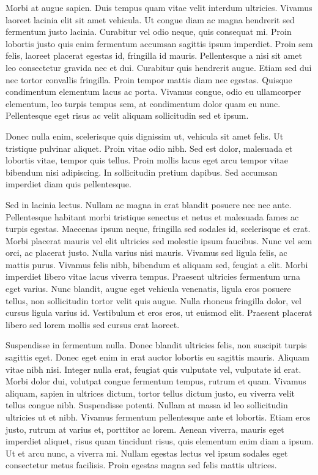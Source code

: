 \begin{acknowledgements}
Morbi at augue sapien. Duis tempus quam vitae velit interdum ultricies. Vivamus laoreet lacinia elit sit amet vehicula. Ut congue diam ac magna hendrerit sed fermentum justo lacinia. Curabitur vel odio neque, quis consequat mi. Proin lobortis justo quis enim fermentum accumsan sagittis ipsum imperdiet. Proin sem felis, laoreet placerat egestas id, fringilla id mauris. Pellentesque a nisi sit amet leo consectetur gravida nec et dui. Curabitur quis hendrerit augue. Etiam sed dui nec tortor convallis fringilla. Proin tempor mattis diam nec egestas. Quisque condimentum elementum lacus ac porta. Vivamus congue, odio eu ullamcorper elementum, leo turpis tempus sem, at condimentum dolor quam eu nunc. Pellentesque eget risus ac velit aliquam sollicitudin sed et ipsum.

Donec nulla enim, scelerisque quis dignissim ut, vehicula sit amet felis. Ut tristique pulvinar aliquet. Proin vitae odio nibh. Sed est dolor, malesuada et lobortis vitae, tempor quis tellus. Proin mollis lacus eget arcu tempor vitae bibendum nisi adipiscing. In sollicitudin pretium dapibus. Sed accumsan imperdiet diam quis pellentesque.

Sed in lacinia lectus. Nullam ac magna in erat blandit posuere nec nec ante. Pellentesque habitant morbi tristique senectus et netus et malesuada fames ac turpis egestas. Maecenas ipsum neque, fringilla sed sodales id, scelerisque et erat. Morbi placerat mauris vel elit ultricies sed molestie ipsum faucibus. Nunc vel sem orci, ac placerat justo. Nulla varius nisi mauris. Vivamus sed ligula felis, ac mattis purus. Vivamus felis nibh, bibendum et aliquam sed, feugiat a elit. Morbi imperdiet libero vitae lacus viverra tempus. Praesent ultricies fermentum urna eget varius. Nunc blandit, augue eget vehicula venenatis, ligula eros posuere tellus, non sollicitudin tortor velit quis augue. Nulla rhoncus fringilla dolor, vel cursus ligula varius id. Vestibulum et eros eros, ut euismod elit. Praesent placerat libero sed lorem mollis sed cursus erat laoreet.

Suspendisse in fermentum nulla. Donec blandit ultricies felis, non suscipit turpis sagittis eget. Donec eget enim in erat auctor lobortis eu sagittis mauris. Aliquam vitae nibh nisi. Integer nulla erat, feugiat quis vulputate vel, vulputate id erat. Morbi dolor dui, volutpat congue fermentum tempus, rutrum et quam. Vivamus aliquam, sapien in ultrices dictum, tortor tellus dictum justo, eu viverra velit tellus congue nibh. Suspendisse potenti. Nullam at massa id leo sollicitudin ultricies ut et nibh. Vivamus fermentum pellentesque ante et lobortis. Etiam eros justo, rutrum at varius et, porttitor ac lorem. Aenean viverra, mauris eget imperdiet aliquet, risus quam tincidunt risus, quis elementum enim diam a ipsum. Ut et arcu nunc, a viverra mi. Nullam egestas lectus vel ipsum sodales eget consectetur metus facilisis. Proin egestas magna sed felis mattis ultrices.


\end{acknowledgements}
